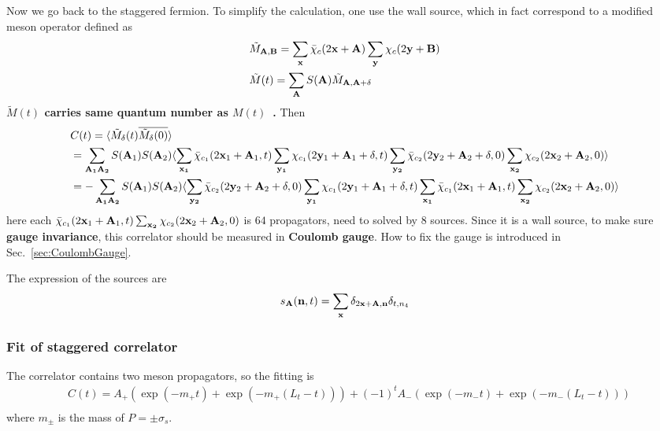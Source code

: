 Now we go back to the staggered fermion. To simplify the calculation, one use the wall source, which in fact correspond to a modified meson operator defined as
\begin{equation}
\begin{split}
&\tilde{M}_{{\bf A},{\bf B}}= \sum _{\bf x}\bar{\chi}_c(2{\bf x}+{\bf A}) \sum _{\bf y}\chi _c (2{\bf y}+{\bf B})\\
&\tilde{M}(t) = \sum _{\bf A} S({\bf A})\tilde{M}_{{\bf A},{\bf A}+\delta}
\end{split}
\end{equation}
\textbf{\textcolor[rgb]{0,0,1}{$\tilde{M}(t)$ carries same quantum number as $M(t)$~\cite{staggeredMeson}.}} Then
\begin{equation}
\begin{split}
&C(t)=\langle \tilde{M}_{\delta}(t) \overline{\tilde{M} _{\delta}(0)}\rangle \\
&= \sum _{\bf A _1 A_2}S({\bf A}_1)S({\bf A}_2)\langle \sum _{\bf x _1}\bar{\chi}_{c_1}(2{\bf x}_1+{\bf A}_1,t) \sum _{\bf y _1}\chi _{c_1} (2{\bf y}_1+{\bf A}_1+\delta,t)  \sum _{\bf y_2}\bar{\chi} _{c_2} (2{\bf y}_2+{\bf A}_2+\delta,0) \sum _{\bf x _2} \chi_{c_2}(2{\bf x}_2+{\bf A}_2,0)\rangle\\
&=-\sum _{\bf A _1 A_2}S({\bf A}_1)S({\bf A}_2)\langle \sum _{\bf y_2}\bar{\chi} _{c_2} (2{\bf y}_2+{\bf A}_2+\delta,0)\sum _{\bf y _1}\chi _{c_1} (2{\bf y}_1+{\bf A}_1+\delta,t)   \sum _{\bf x _1}\bar{\chi}_{c_1}(2{\bf x}_1+{\bf A}_1,t) \sum _{\bf x _2} \chi_{c_2}(2{\bf x}_2+{\bf A}_2,0)\rangle\\
\end{split}
\end{equation}
here each $\bar{\chi}_{c_1}(2{\bf x}_1+{\bf A}_1,t) \sum _{\bf x _2} \chi_{c_2}(2{\bf x}_2+{\bf A}_2,0)$ is $64$ propagators, need to solved by $8$ sources. Since it is a wall source, to make sure \textbf{gauge invariance}, this correlator should be measured in \textcolor[rgb]{0,0,1}{\textbf{Coulomb gauge}}. How to fix the gauge is introduced in Sec.~\ref{sec:CoulombGauge}.

The expression of the sources are
\begin{equation}
\begin{split}
&s_{\bf A}({\bf n}, t) = \sum _{{\bf x}} \delta _{2{\bf x}+{\bf A},{\bf n}}\delta _{t,n_4}\\
\end{split}
\end{equation}

\subsubsection{\label{Fitofstaggeredcorrelator}Fit of staggered correlator}

The correlator contains two meson propagators, so the fitting is
\begin{equation}
\begin{split}
&C(t)=A_+ \left(\exp(-m_+t)+\exp (-m_+(L_t-t))\right) + (-1)^t A_- \left(\exp(-m_-t)+\exp (-m_-(L_t-t))\right)\\
\end{split}
\end{equation}
where $m_{\pm}$ is the mass of $P=\pm \sigma _s$.